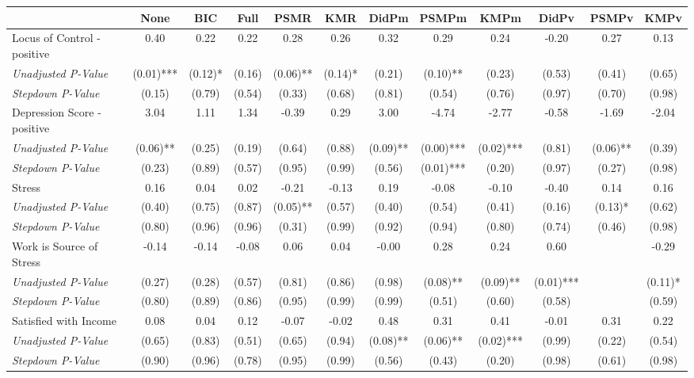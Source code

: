\begin{tabular}{l c c c c c c c c c c c}
\toprule
 & None & BIC & Full & PSMR & KMR & DidPm & PSMPm & KMPm & DidPv & PSMPv & KMPv \\
\midrule
Locus of Control - positive & 0.40 & 0.22 & 0.22 & 0.28 & 0.26 & 0.32 & 0.29 & 0.24 & -0.20 & 0.27 & 0.13 \\
\quad \textit{Unadjusted P-Value} & (0.01)*** & (0.12)* & (0.16) & (0.06)** & (0.14)* & (0.21) & (0.10)** & (0.23) & (0.53) & (0.41) & (0.65) \\
\quad \textit{Stepdown P-Value} & (0.15) & (0.79) & (0.54) & (0.33) & (0.68) & (0.81) & (0.54) & (0.76) & (0.97) & (0.70) & (0.98) \\
Depression Score - positive & 3.04 & 1.11 & 1.34 & -0.39 & 0.29 & 3.00 & -4.74 & -2.77 & -0.58 & -1.69 & -2.04 \\
\quad \textit{Unadjusted P-Value} & (0.06)** & (0.25) & (0.19) & (0.64) & (0.88) & (0.09)** & (0.00)*** & (0.02)*** & (0.81) & (0.06)** & (0.39) \\
\quad \textit{Stepdown P-Value} & (0.23) & (0.89) & (0.57) & (0.95) & (0.99) & (0.56) & (0.01)*** & (0.20) & (0.97) & (0.27) & (0.98) \\
Stress & 0.16 & 0.04 & 0.02 & -0.21 & -0.13 & 0.19 & -0.08 & -0.10 & -0.40 & 0.14 & 0.16 \\
\quad \textit{Unadjusted P-Value} & (0.40) & (0.75) & (0.87) & (0.05)** & (0.57) & (0.40) & (0.54) & (0.41) & (0.16) & (0.13)* & (0.62) \\
\quad \textit{Stepdown P-Value} & (0.80) & (0.96) & (0.96) & (0.31) & (0.99) & (0.92) & (0.94) & (0.80) & (0.74) & (0.46) & (0.98) \\
Work is Source of Stress & -0.14 & -0.14 & -0.08 & 0.06 & 0.04 & -0.00 & 0.28 & 0.24 & 0.60 & & -0.29 \\
\quad \textit{Unadjusted P-Value} & (0.27) & (0.28) & (0.57) & (0.81) & (0.86) & (0.98) & (0.08)** & (0.09)** & (0.01)*** & & (0.11)* \\
\quad \textit{Stepdown P-Value} & (0.80) & (0.89) & (0.86) & (0.95) & (0.99) & (0.99) & (0.51) & (0.60) & (0.58) & & (0.59) \\
Satisfied with Income & 0.08 & 0.04 & 0.12 & -0.07 & -0.02 & 0.48 & 0.31 & 0.41 & -0.01 & 0.31 & 0.22 \\
\quad \textit{Unadjusted P-Value} & (0.65) & (0.83) & (0.51) & (0.65) & (0.94) & (0.08)** & (0.06)** & (0.02)*** & (0.99) & (0.22) & (0.54) \\
\quad \textit{Stepdown P-Value} & (0.90) & (0.96) & (0.78) & (0.95) & (0.99) & (0.56) & (0.43) & (0.20) & (0.98) & (0.61) & (0.98) \\

\end{tabular}

